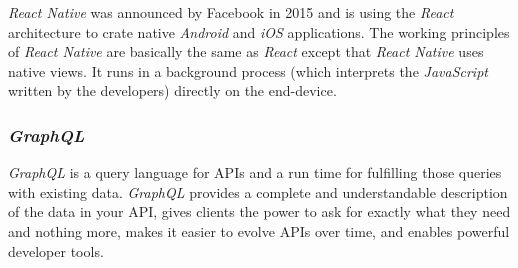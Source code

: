 \textit{React Native} was announced by Facebook in 2015 and is using the \textit{React} architecture to crate native \textit{Android} and \textit{iOS} applications. 
\newline
The working principles of \textit{React Native} are basically the same as \textit{React} except that \textit{React Native} uses native views. It runs in a background process (which interprets the \textit{JavaScript} written by the developers) directly on the end-device.

\subsubsection{\textit{GraphQL}}
\label{sssec:graphql}

\textit{GraphQL} is a query language for APIs and a run time for fulfilling those queries with existing data. \textit{GraphQL} provides a complete and understandable description of the data in your API, gives clients the power to ask for exactly what they need and nothing more, makes it easier to evolve APIs over time, and enables powerful developer tools.